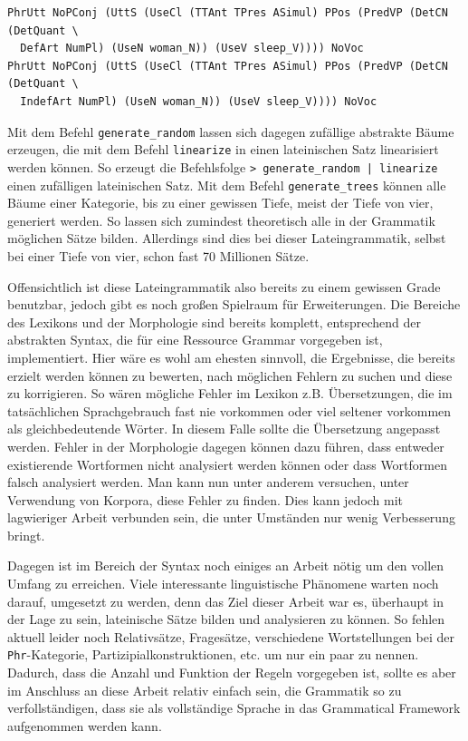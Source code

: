 \begin{lstlisting}[float=h!tp,caption={Abstrakte Syntaxrepräsentationen des Satzes \textit{feminae dormiunt}},label={GF-AbstractStrings},basicstyle=\small]
PhrUtt NoPConj (UttS (UseCl (TTAnt TPres ASimul) PPos (PredVP (DetCN (DetQuant \
  DefArt NumPl) (UseN woman_N)) (UseV sleep_V)))) NoVoc 
PhrUtt NoPConj (UttS (UseCl (TTAnt TPres ASimul) PPos (PredVP (DetCN (DetQuant \
  IndefArt NumPl) (UseN woman_N)) (UseV sleep_V)))) NoVoc
\end{lstlisting}
Mit dem Befehl \texttt{generate\_random} lassen sich dagegen zufällige abstrakte Bäume erzeugen, die mit dem Befehl \texttt{linearize} in einen lateinischen Satz linearisiert werden können. So erzeugt die Befehlsfolge \texttt{> generate\_random | linearize } einen zufälligen lateinischen Satz. Mit dem Befehl \texttt{generate\_trees} können alle Bäume einer Kategorie, bis zu einer gewissen Tiefe, meist der Tiefe von vier, generiert werden. So lassen sich zumindest theoretisch alle in der Grammatik möglichen Sätze bilden. Allerdings sind dies bei dieser Lateingrammatik, selbst bei einer Tiefe von vier, schon fast 70 Millionen Sätze. \par
Offensichtlich ist diese Lateingrammatik also bereits zu einem gewissen Grade benutzbar, jedoch gibt es noch großen Spielraum für Erweiterungen. Die Bereiche des Lexikons und der Morphologie sind bereits komplett, entsprechend der abstrakten Syntax, die für eine Ressource Grammar vorgegeben ist, implementiert. Hier wäre es wohl am ehesten sinnvoll, die Ergebnisse, die bereits erzielt werden können zu bewerten, nach möglichen Fehlern zu suchen und diese zu korrigieren. So wären mögliche Fehler im Lexikon z.B. Übersetzungen, die im tatsächlichen Sprachgebrauch fast nie vorkommen oder viel seltener vorkommen als gleichbedeutende Wörter. In diesem Falle sollte die Übersetzung angepasst werden. Fehler in der Morphologie dagegen können dazu führen, dass entweder existierende Wortformen nicht analysiert werden können oder dass Wortformen falsch analysiert werden. Man kann nun unter anderem versuchen, unter Verwendung von Korpora, diese Fehler zu finden. Dies kann jedoch mit lagwieriger Arbeit verbunden sein, die unter Umständen nur wenig Verbesserung bringt. \par
Dagegen ist im Bereich der Syntax noch einiges an Arbeit nötig um den vollen Umfang zu erreichen. Viele interessante linguistische Phänomene warten noch darauf, umgesetzt zu werden, denn das Ziel dieser Arbeit war es, überhaupt in der Lage zu sein, lateinische Sätze bilden und analysieren zu können. So fehlen aktuell leider noch Relativsätze, Fragesätze, verschiedene Wortstellungen bei der \texttt{Phr}-Kategorie, Partizipialkonstruktionen, etc. um nur ein paar zu nennen. Dadurch, dass die Anzahl und Funktion der Regeln vorgegeben ist, sollte es aber im Anschluss an diese Arbeit relativ einfach sein, die Grammatik so zu verfollständigen, dass sie als vollständige Sprache in das Grammatical Framework aufgenommen werden kann. 
